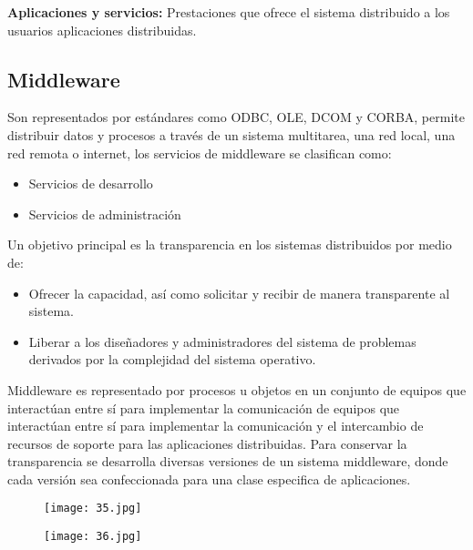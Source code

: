 \textbf{Aplicaciones y servicios:} Prestaciones que ofrece el sistema distribuido a los usuarios aplicaciones distribuidas.

\begin{center}
\subsection{Middleware}
\end{center}

Son representados por estándares como ODBC, OLE, DCOM y CORBA, permite distribuir datos y procesos a través de un sistema multitarea, una red local, una red remota o internet, los servicios de middleware se clasifican como:

\begin{itemize}
	\item Servicios de desarrollo
	\item Servicios de administración
\end{itemize}

Un objetivo principal es la transparencia en los sistemas distribuidos por medio de:

\begin{itemize}
	\item Ofrecer la capacidad, así como solicitar y recibir de manera transparente al sistema.
	\item Liberar a los diseñadores y administradores del sistema de problemas derivados por la complejidad del sistema operativo.
\end{itemize}

Middleware es representado por procesos u objetos en un conjunto de equipos que interactúan entre sí para implementar la comunicación de equipos que interactúan entre sí para implementar la comunicación y el intercambio de recursos de soporte para las aplicaciones distribuidas. Para conservar la transparencia se desarrolla diversas versiones de un sistema middleware, donde cada versión sea confeccionada para una clase especifica de aplicaciones.

\begin{figure}[h!]
		\centering
		{\texttt{[image: 35.jpg]}\par} \vspace{1cm}
\end{figure}

\begin{figure}[h!]
		\centering
		{\texttt{[image: 36.jpg]}\par} \vspace{1cm}
\end{figure}

